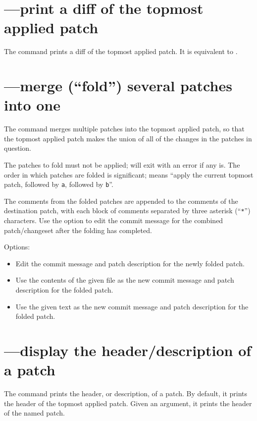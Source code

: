 \section{---print a diff of the topmost applied patch}

The  command prints a diff of the topmost applied patch.
It is equivalent to .

\section{---merge (``fold'') several patches into one}

The  command merges multiple patches into the topmost
applied patch, so that the topmost applied patch makes the union of
all of the changes in the patches in question.

The patches to fold must not be applied;  will exit with
an error if any is.  The order in which patches are folded is
significant;  means ``apply the current topmost
patch, followed by \texttt{a}, followed by \texttt{b}''.

The comments from the folded patches are appended to the comments of
the destination patch, with each block of comments separated by three
asterisk (``\texttt{*}'') characters.  Use the 
option to edit the commit message for the combined patch/changeset
after the folding has completed.

Options:
\begin{itemize}
\item[\hgxopt{mq}{qfold}{-e}] Edit the commit message and patch description
  for the newly folded patch.
\item[\hgxopt{mq}{qfold}{-l}] Use the contents of the given file as the new
  commit message and patch description for the folded patch.
\item[\hgxopt{mq}{qfold}{-m}] Use the given text as the new commit message
  and patch description for the folded patch.
\end{itemize}

\section{---display the header/description of a patch}

The  command prints the header, or description, of a
patch.  By default, it prints the header of the topmost applied patch.
Given an argument, it prints the header of the named patch.

